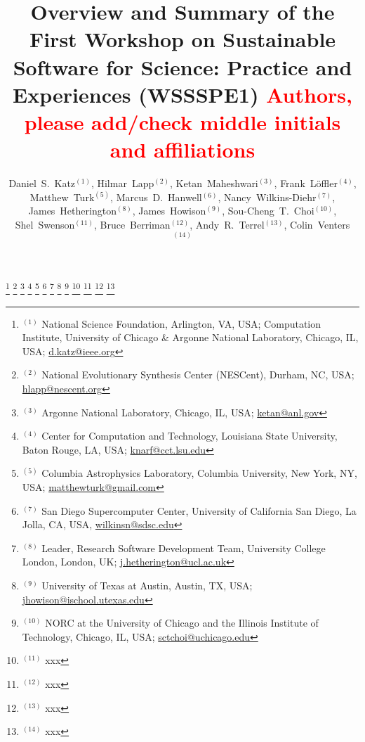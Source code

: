 \documentclass[11pt, oneside]{amsart}
\newcommand{\note}[1]{ {\textcolor{red}    { #1 }}}
\begin{document}
\title[]{Overview and Summary of the First Workshop on Sustainable Software for Science: Practice and Experiences (WSSSPE1) 
\note{\scriptsize Authors, please add/check middle initials and affiliations}}

\author{Daniel~S.~Katz$^{(1)}$, Hilmar~Lapp$^{(2)}$, Ketan~Maheshwari$^{(3)}$, Frank~L\"{o}ffler$^{(4)}$, 
Matthew~Turk$^{(5)}$, Marcus~D.~Hanwell$^{(6)}$, Nancy~Wilkins-Diehr$^{(7)}$, James~Hetherington$^{(8)}$, 
James~Howison$^{(9)}$, Sou-Cheng~T.~Choi$^{(10)}$, Shel~Swenson$^{(11)}$,  Bruce~Berriman$^{(12)}$, Andy~R.~Terrel$^{(13)}$, Colin~Venters$^{(14)}$}

\thanks{{}$^{(1)}$ National Science Foundation, Arlington, VA, USA; Computation Institute, University of Chicago \& Argonne National Laboratory, Chicago, IL, USA; \url{d.katz@ieee.org}}
%
\thanks{{}$^{(2)}$ National Evolutionary Synthesis Center (NESCent),
  Durham, NC, USA; \url{hlapp@nescent.org}}
%
\thanks{{}$^{(3)}$ Argonne National Laboratory, Chicago, IL, USA; \url{ketan@anl.gov}}
%
\thanks{{}$^{(4)}$ Center for Computation and Technology, Louisiana State University, Baton Rouge, LA, USA; \url{knarf@cct.lsu.edu}}
%
\thanks{{}$^{(5)}$ Columbia Astrophysics Laboratory, Columbia University, New
York, NY, USA; \url{matthewturk@gmail.com}}
%
\thanks{{}$^{(7)}$ San Diego Supercomputer Center, University of California San Diego, La Jolla, CA, USA, \url{wilkinsn@sdsc.edu}}
%
\thanks{{}$^{(8)}$ Leader, Research Software Development Team, University College London, London, UK; \url {j.hetherington@ucl.ac.uk}}
%
\thanks{{}$^{(9)}$ University of Texas at Austin, Austin, TX, USA; \url{jhowison@ischool.utexas.edu}}
%
\thanks{{}$^{(10)}$ NORC at the University of Chicago and the Illinois Institute of Technology, Chicago, IL, USA; \url{sctchoi@uchicago.edu}}
% 
\thanks{{}$^{(11)}$ xxx}
%
\thanks{{}$^{(12)}$ xxx}
%
\thanks{{}$^{(13)}$ xxx}
%
\thanks{{}$^{(14)}$ xxx}
\end{document}
